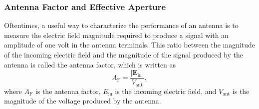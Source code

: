 \subsubsection{Antenna Factor and Effective Aperture}
\label{sec:ant-factor}
Oftentimes, a useful way to characterize the performance of an antenna is to measure the electric field magnitude required to produce a signal with an amplitude of one volt in the antenna terminals. This ratio between the magnitude of the incoming electric field and the magnitude of the signal produced by the antenna is called the antenna factor, which is written as
\begin{equation}
    A_\mathrm{F} = \frac{|\mathbf{E}_\mathrm{in}|}{V_\mathrm{ant}},
    \label{eq:antenna-factor}
\end{equation}
where $A_\mathrm{F}$ is the antenna factor, $E_\mathrm{in}$ is the incoming electric field, and $V_\mathrm{ant}$ is the magnitude of the voltage produced by the antenna.

